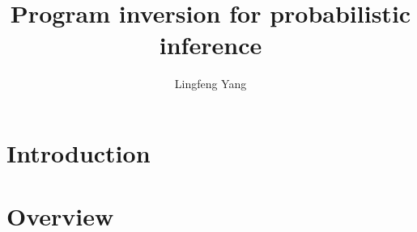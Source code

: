 \documentclass{acmsiggraph}
\begin{document}
\title{Program inversion for probabilistic inference}

\author{Lingfeng Yang}
\maketitle

\begin{abstract}

\end{abstract}

\section{Introduction}










\section{Overview}



\end{document}
